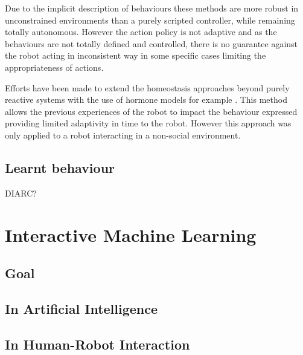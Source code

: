     Due to the implicit description of behaviours these methods are more robust
    in unconstrained environments than a purely scripted controller, while
    remaining totally autonomous. However the action policy is not adaptive and
    as the behaviours are not totally defined and controlled, there is no
    guarantee against the robot acting in inconsistent way in some specific
    cases limiting the appropriateness of actions.

    Efforts have been made to extend the homeostasis approaches beyond purely
    reactive systems with the use of hormone models  for example
    \citep{Lones2014}. This method allows the previous experiences of the robot
    to impact the behaviour expressed providing limited adaptivity in time to
    the robot. However this approach was only applied to a robot interacting in
    a non-social environment.

\subsection{Learnt behaviour}

DIARC?

\section{Interactive Machine Learning}

\subsection{Goal}

\subsection{In Artificial Intelligence}

\subsection{In Human-Robot Interaction}

